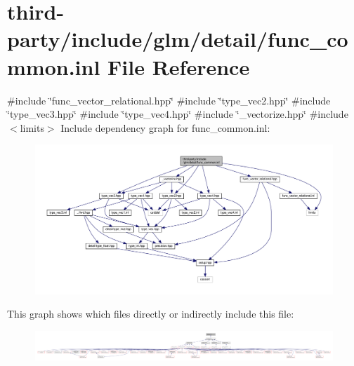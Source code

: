 \hypertarget{func__common_8inl}{}\section{third-\/party/include/glm/detail/func\+\_\+common.inl File Reference}
\label{func__common_8inl}
{\ttfamily \#include \char`\"{}func\+\_\+vector\+\_\+relational.\+hpp\char`\"{}}\newline
{\ttfamily \#include \char`\"{}type\+\_\+vec2.\+hpp\char`\"{}}\newline
{\ttfamily \#include \char`\"{}type\+\_\+vec3.\+hpp\char`\"{}}\newline
{\ttfamily \#include \char`\"{}type\+\_\+vec4.\+hpp\char`\"{}}\newline
{\ttfamily \#include \char`\"{}\+\_\+vectorize.\+hpp\char`\"{}}\newline
{\ttfamily \#include $<$limits$>$}\newline
Include dependency graph for func\+\_\+common.\+inl\+:
\nopagebreak
\begin{figure}[H]
\begin{center}
\leavevmode
\includegraphics[width=350pt]{func__common_8inl__incl}
\end{center}
\end{figure}
This graph shows which files directly or indirectly include this file\+:
\nopagebreak
\begin{figure}[H]
\begin{center}
\leavevmode
\includegraphics[width=350pt]{func__common_8inl__dep__incl}
\end{center}
\end{figure}
